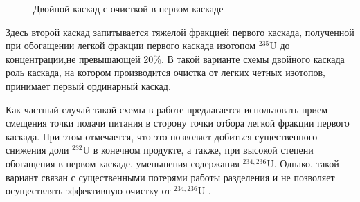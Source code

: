 \begin{figure}[ht]
  \caption{Двойной каскад с очисткой в первом каскаде}\label{fig:pure_double}
\end{figure}

Здесь второй каскад запитывается тяжелой фракцией первого каскада, полученной при обогащении легкой фракции первого каскада изотопом $^{235}$U до концентрации,не превышающей 20\%.
В такой варианте схемы двойного каскада роль каскада, на котором производится очистка от легких четных изотопов, принимает первый ординарный каскад.

Как частный случай такой схемы в работе \cite{palkinReprocessedUraniumPurification2013} предлагается использовать прием смещения точки подачи питания в сторону точки отбора легкой фракции первого каскада.
При этом отмечается, что это позволяет добиться существенного снижения доли $^{232}$U в конечном продукте, а также, при высокой степени обогащения в первом каскаде, уменьшения содержания $^{234,236}$U.
Однако, такой вариант связан с существенными потерями работы разделения и не позволяет осуществлять эффективную очистку от $^{234,236}$U \cite{palkinPurificationReprocessedUranium2016}.


